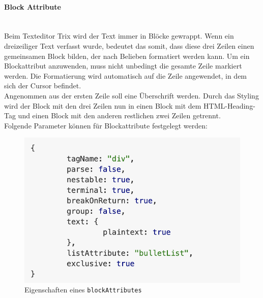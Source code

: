 \paragraph{Block Attribute}
\label{paragraph_blockAttribute}\mbox{}\\
Beim Texteditor Trix wird der Text immer in Blöcke gewrappt. Wenn ein dreizeiliger Text verfasst wurde, bedeutet das somit, dass diese drei Zeilen einen gemeinsamen Block bilden, der nach Belieben formatiert werden kann. Um ein Blockattribut anzuwenden, muss nicht unbedingt die gesamte Zeile markiert werden. Die Formatierung wird automatisch auf die Zeile angewendet, in dem sich der Cursor befindet.\\
Angenommen aus der ersten Zeile soll eine Überschrift werden. Durch das Styling wird der Block mit den drei Zeilen nun in einen Block mit dem HTML-Heading-Tag und einen Block mit den anderen restlichen zwei Zeilen getrennt.\\
Folgende Parameter können für Blockattribute festgelegt werden:

\begin{figure}[H]
\begin{center}
	\includegraphics[scale=.7]{images/block_attributes.png}
\end{center}
	\caption{Eigenschaften eines \texttt{blockAttributes}}
\end{figure}


